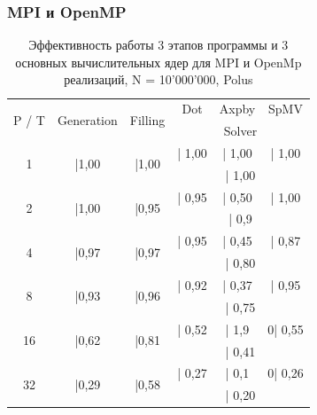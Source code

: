 		\subsubsection{MPI и OpenMP}
		\begin{table}[H]
			\centering
			\begin{tabular}{|c||c|c|c|c|c|}
				\hline
				\multirow{2}{*}{P / T} &  \multirow{2}{*}{Generation} & \multirow{2}{*}{Filling} & Dot & Axpby & SpMV\\ \cline{4-6}
				                   &                              &                         & \multicolumn{3}{c|}{Solver} \\ \hline
                \multirow{2}{*}{1} & \multirow{2}{*}{|1,00} & \multirow{2}{*}{|1,00} & | 1,00& | 1,00&  | 1,00\\ \cline{4-6}
                                   &                   &                   & \multicolumn{3}{c|}{| 1,00}   \\ \hline
                \multirow{2}{*}{2} & \multirow{2}{*}{|1,00} & \multirow{2}{*}{|0,95} & | 0,95& | 0,50&  | 1,00\\ \cline{4-6}
                                   &                   &                   & \multicolumn{3}{c|}{| 0,9}   \\ \hline
                \multirow{2}{*}{4} & \multirow{2}{*}{|0,97} & \multirow{2}{*}{|0,97} & | 0,95& | 0,45&  | 0,87\\ \cline{4-6}
                                   &                   &                   & \multicolumn{3}{c|}{| 0,80}   \\ \hline
                \multirow{2}{*}{8} & \multirow{2}{*}{|0,93} & \multirow{2}{*}{|0,96} & | 0,92& | 0,37&  | 0,95\\ \cline{4-6}
                                   &                   &                   & \multicolumn{3}{c|}{| 0,75}   \\ \hline
                \multirow{2}{*}{16} & \multirow{2}{*}{|0,62} & \multirow{2}{*}{|0,81} & | 0,52& | 1,9& 0| 0,55\\ \cline{4-6}
                                   &                   &                   & \multicolumn{3}{c|}{| 0,41}   \\ \hline
                \multirow{2}{*}{32} & \multirow{2}{*}{|0,29} & \multirow{2}{*}{|0,58} & | 0,27& | 0,1& 0| 0,26\\ \cline{4-6}
                                   &                   &                   & \multicolumn{3}{c|}{| 0,20}   \\ \hline

			\end{tabular}
			\caption{Эффективность работы 3 этапов программы и 3 основных вычислительных ядер для MPI и OpenMp реализаций, N = 10'000'000, Polus}
			\label{par_1}
		\end{table}
